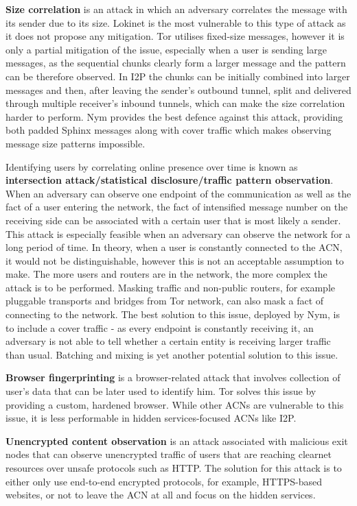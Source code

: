 \textbf{Size correlation} is an attack in which an adversary correlates the message with its sender due to its size. Lokinet is the most vulnerable to this type of attack as it does not propose any mitigation. Tor utilises fixed-size messages, however it is only a partial mitigation of the issue, especially when a user is sending large messages, as the sequential chunks clearly form a larger message and the pattern can be therefore observed. In I2P the chunks can be initially combined into larger messages and then, after leaving the sender’s outbound tunnel, split and delivered through multiple receiver’s inbound tunnels, which can make the size correlation harder to perform. Nym provides the best defence against this attack, providing both padded Sphinx messages along with cover traffic which makes observing message size patterns impossible.

Identifying users by correlating online presence over time is known as \textbf{intersection attack/statistical disclosure/traffic pattern observation}. When an adversary can observe one endpoint of the communication as well as the fact of a user entering the network, the fact of intensified message number on the receiving side can be associated with a certain user that is most likely a sender. This attack is especially feasible when an adversary can observe the network for a long period of time. In theory, when a user is constantly connected to the ACN, it would not be distinguishable, however this is not an acceptable assumption to make. The more users and routers are in the network, the more complex the attack is to be performed. Masking traffic and non-public routers, for example pluggable transports and bridges from Tor network, can also mask a fact of connecting to the network. The best solution to this issue, deployed by Nym, is to include a cover traffic - as every endpoint is constantly receiving it, an adversary is not able to tell whether a certain entity is receiving larger traffic than usual. Batching and mixing is yet another potential solution to this issue.

\textbf{Browser fingerprinting} is a browser-related attack that involves collection of user’s data that can be later used to identify him. Tor solves this issue by providing a custom, hardened browser. While other ACNs are vulnerable to this issue, it is less performable in hidden services-focused ACNs like I2P.

\textbf{Unencrypted content observation} is an attack associated with malicious exit nodes that can observe unencrypted traffic of users that are reaching clearnet resources over unsafe protocols such as HTTP. The solution for this attack is to either only use end-to-end encrypted protocols, for example, HTTPS-based websites, or not to leave the ACN at all and focus on the hidden services.

